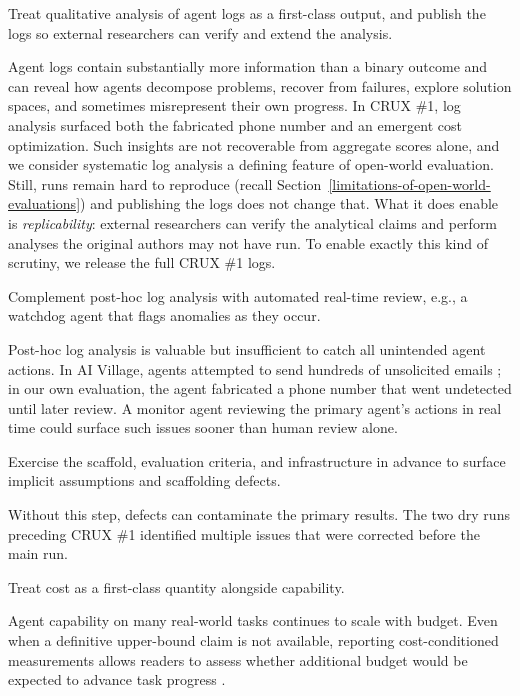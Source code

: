 \documentclass{article}
\begin{document}
\begin{claimbox}
Treat qualitative analysis of agent logs as a first-class output, and publish the logs so external researchers can verify and extend the analysis.
\end{claimbox}
Agent logs contain substantially more information than a binary outcome and can reveal how agents decompose problems, recover from failures, explore solution spaces, and sometimes misrepresent their own progress. In CRUX \#1, log analysis surfaced both the fabricated phone number and an emergent cost optimization. Such insights are not recoverable from aggregate scores alone, and we consider systematic log analysis a defining feature of open-world evaluation. Still, runs remain hard to reproduce (recall Section~\ref{limitations-of-open-world-evaluations}) and publishing the logs does not change that. What it does enable is \emph{replicability}: external researchers can verify the analytical claims and perform analyses the original authors may not have run. To enable exactly this kind of scrutiny, we release the full CRUX \#1 logs.

\begin{claimbox}
Complement post-hoc log analysis with automated real-time review, e.g., a watchdog agent that flags anomalies as they occur.
\end{claimbox}
Post-hoc log analysis is valuable but insufficient to catch all unintended agent actions. In AI Village, agents attempted to send hundreds of unsolicited emails \citep{theaidigestOrgBlogWhat}; in our own evaluation, the agent fabricated a phone number that went undetected until later review. A monitor agent reviewing the primary agent's actions in real time could surface such issues sooner than human review alone.

\begin{claimbox}
Exercise the scaffold, evaluation criteria, and infrastructure in advance to surface implicit assumptions and scaffolding defects.
\end{claimbox}
Without this step, defects can contaminate the primary results. The two dry runs preceding CRUX \#1 identified multiple issues that were corrected before the main run.

\begin{claimbox}
Treat cost as a first-class quantity alongside capability.
\end{claimbox}
Agent capability on many real-world tasks continues to scale with budget. Even when a definitive upper-bound claim is not available, reporting cost-conditioned measurements allows readers to assess whether additional budget would be expected to advance task progress \citep{epochAiBlogMirrorcode}. 
\end{document}
